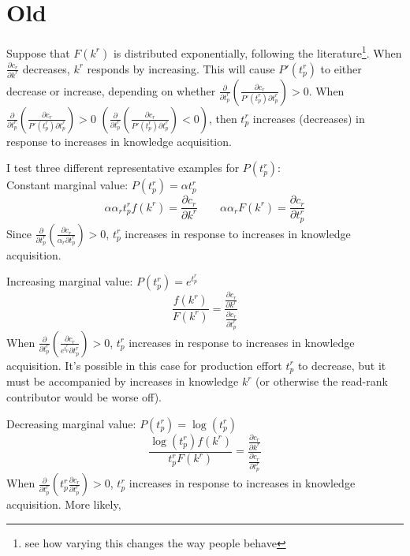\documentclass[source/paper/main.tex]{subfiles}
\begin{document}
\section{Old}

Suppose that $F(k^r)$ is distributed exponentially, following the literature\footnote{see how varying this changes the way people behave}. When $\frac{\partial c_r}{\partial k^r}$ decreases,  $k^r$ responds by increasing. This will cause $P'(t_p^r)$ to either decrease or increase, depending on whether $\frac{\partial }{\partial t_p^r}(\frac{\partial c_r}{P'(t_p^r)\partial t_p^r})>0$. When $\frac{\partial }{\partial t_p^r}(\frac{\partial c_r}{P'(t_p^r)\partial t_p^r})>0$ $(\frac{\partial }{\partial t_p^r}(\frac{\partial c_r}{P'(t_p^r)\partial t_p^r})<0)$, then $t_p^r$ increases (decreases) in response to increases in knowledge acquisition. 


I test three different representative examples for $P(t_p^r)$:\\
Constant marginal value: $P(t_p^r) = \alpha t_p^r$
$$\alpha \alpha_r  t_p^r f(k^r)= \frac{\partial c_r}{\partial k^r} \qquad \alpha \alpha_r F(k^r) = \frac{\partial c_r}{\partial t_p^r}$$
Since $\frac{\partial }{\partial t_p^r}(\frac{\partial c_r}{\alpha_r \partial t_p^r})>0$, $t_p^r$ increases in response to increases in knowledge acquisition. 
 
 Increasing marginal value: $P(t_p^r) = e^{t_p^r}$
$$\frac{f(k^r)}{F(k^r)} = \frac{\frac{\partial c_r}{\partial k^r}}{\frac{\partial c_r}{\partial t_p^r}}$$
When $\frac{\partial }{\partial t_p^r}(\frac{\partial c_r}{e^{t_p^r} \partial t_p^r})>0$, $t_p^r$ increases in response to increases in knowledge acquisition. It's possible in this case for production effort $t_p^r$ to decrease, but it must be accompanied by increases in knowledge $k^r$ (or otherwise the read-rank contributor would be worse off). 

Decreasing marginal value: $P(t_p^r) = \log(t_p^r)$
$$\frac{\log(t_p^r)f(k^r)}{t_p^rF(k^r)} = \frac{\frac{\partial c_r}{\partial k^r}}{\frac{\partial c_r}{\partial t_p^r}}$$
When $\frac{\partial }{\partial t_p^r}(t_p^r \frac{\partial c_r}{\partial t_p^r})>0$, $t_p^r$ increases in response to increases in knowledge acquisition. More likely, \\
\end{document}
